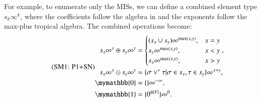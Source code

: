 \documentclass[review, onefignum, onetabnum]{siamart190516}
\begin{document}
For example, to enumerate only the MISs, we can define a combined element type $s_{k}\infty^k$, where the coefficients follow the algebra in  and the exponents follow the max-plus tropical algebra.
The combined operations become: 
\begin{equation}
\eqname{P1+SN}
\begin{split}
    s_x\infty^x \oplus s_y\infty^y &= \begin{cases}
        (s_x \cup s_y)\infty^{\max(x,y)}, & x = y\\
        s_y\infty^{\max(x,y)}, & x < y\\
        s_x\infty^{\max(x,y)}, & x > y
    \end{cases},\\
    s_x\infty^x \odot s_y\infty^y &= \{\sigma \lor^\circ \tau | \sigma \in s_x, \tau \in s_y\}\infty^{x+y},\\
    \mymathbb{0} &= \{\}\infty^{-\infty},\\
    \mymathbb{1} &= \{0^{\otimes |V|}\}\infty^{0}. \label{eq:countingtropicalset}
\end{split}
\end{equation}
\end{document}
